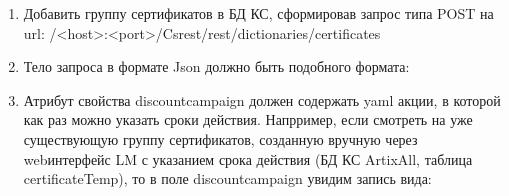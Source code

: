 \documentclass[letterpaper,10pt,russian]{sphinxmanual}
\begin{document}
\begin{enumerate}
%
\item {} 
\sphinxAtStartPar
Добавить группу сертификатов в БД КС, сформировав запрос типа POST на url: /\textless{}host\textgreater{}:\textless{}port\textgreater{}/Csrest/rest/dictionaries/certificates

\item {} 
\sphinxAtStartPar
Тело запроса в формате Json должно быть подобного формата:
\begin{quote}

\begin{sphinxVerbatim}[commandchars=\\\{\}]
\end{sphinxVerbatim}
\end{quote}

\item {} 
\sphinxAtStartPar
Атрибут свойства  discountcampaign должен содержать yaml акции, в которой как раз можно указать сроки действия.
Напрример, если смотреть на уже существующую группу сертификатов, созданную вручную через web\sphinxhyphen{}интерфейс LM с указанием срока действия (БД КС ArtixAll, таблица certificateTemp), то в поле discountcampaign увидим запись вида:
\begin{quote}


\end{quote}
\end{enumerate}
\end{document}
